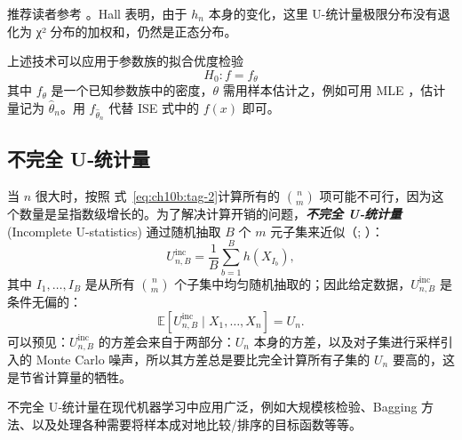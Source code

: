 推荐读者参考 \cite{hall1984}。Hall 表明，由于 $h_n$ 本身的变化，这里 U-统计量极限分布没有退化为 χ² 分布的加权和，仍然是正态分布。

上述技术可以应用于参数族的拟合优度检验
\[H_0: f = f_\theta\]
其中 $f_\theta$ 是一个已知参数族中的密度，$\theta$ 需用样本估计之，例如可用 MLE ，估计量记为 $\widehat{\theta}_n$。用 $f_{\widehat\theta_n}$ 代替 ISE 式中的 $f(x)$ 即可。

\subsection{不完全 U‑统计量}

当 $n$ 很大时，按照 式~\eqref{eq:ch10b:tag-2}计算所有的 $\binom{n}{m}$ 项可能不可行，因为这个数量是呈指数级增长的。为了解决计算开销的问题，\textbf{\emph{不完全 U‑统计量}} (Incomplete U-statistics) 通过随机抽取 $B$ 个 $m$ 元子集来近似（\cite{blom1976}; \cite{janson1984}）：
\[U_{n,B}^{\mathrm{inc}} = \frac{1}{B} \sum_{b=1}^{B} h(X_{I_b}),\]
其中 $I_1,\dots,I_B$ 是从所有 $\binom{n}{m}$ 个子集中均匀随机抽取的；因此给定数据，$U_{n,B}^{\mathrm{inc}}$ 是条件无偏的：
\[
\mathbb{E}[U_{n,B}^{\mathrm{inc}}\mid X_1,\dots,X_n]=U_n.
\]
可以预见：$U_{n,B}^{\mathrm{inc}}$ 的方差会来自于两部分：$U_n$ 本身的方差，以及对子集进行采样引入的 Monte Carlo 噪声，所以其方差总是要比完全计算所有子集的 $U_n$ 要高的，这是节省计算量的牺牲。

不完全 U‑统计量在现代机器学习中应用广泛，例如大规模核检验、Bagging 方法、以及处理各种需要将样本成对地比较/排序的目标函数等等。

